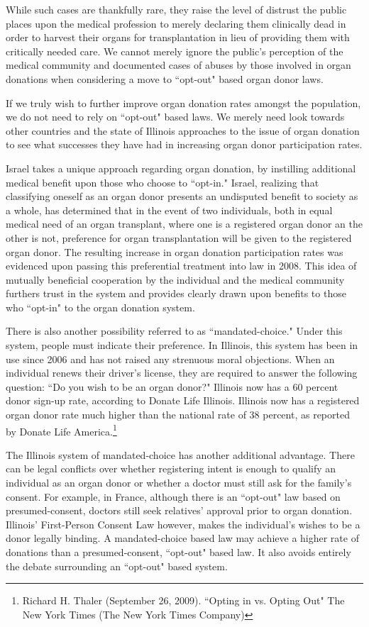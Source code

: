 \documentclass[letterpaper,10pt,twoside]{article}
\begin{document}
While such cases are thankfully rare, they raise the level of distrust the public places upon the medical profession to merely declaring them clinically dead in order to harvest their organs for transplantation  in lieu of providing them with critically needed care.  We cannot merely ignore the public's perception of the medical community and documented cases of abuses by those involved in organ donations when considering a move to ``opt-out" based organ donor laws.

If we truly wish to further improve organ donation rates amongst the population, we do not need to rely on ``opt-out" based laws.  We merely need look towards other countries and the state of Illinois approaches to the issue of organ donation to see what successes they have had in increasing organ donor participation rates.

Israel takes a unique approach regarding organ donation, by instilling additional medical benefit upon those who choose to ``opt-in."  Israel, realizing that classifying oneself as an organ donor presents an undisputed benefit to society as a whole, has determined that in the event of two individuals, both in equal medical need of an organ transplant, where one is a registered organ donor an the other is not, preference for organ transplantation will be given to the registered organ donor.  The resulting increase in organ donation participation rates was evidenced upon passing this preferential treatment into law in 2008.  This idea of mutually beneficial cooperation by the individual and the medical community furthers trust in the system and provides clearly drawn upon benefits to those who ``opt-in" to the organ donation system.

There is also another possibility referred to as ``mandated-choice."  Under this system, people must indicate their preference.  In Illinois, this system has been in use since 2006 and has not raised any strenuous moral objections.  When an individual renews their driver's license, they are required to answer the following question: ``Do you wish to be an organ donor?"  Illinois now has a 60 percent donor sign-up rate, according to Donate Life Illinois.  Illinois now has a registered organ donor rate much higher than the national rate of 38 percent, as reported by Donate Life America.\footnote{Richard H. Thaler (September 26, 2009). ``Opting in vs. Opting Out" The New York Times (The New York Times Company)}

The Illinois system of mandated-choice has another additional advantage.  There can be legal conflicts over whether registering intent is enough to qualify an individual as an organ donor or whether a doctor must still ask for the family's consent. For example, in France, although there is an ``opt-out" law based on presumed-consent, doctors still seek relatives' approval prior to organ donation.  Illinois' First-Person Consent Law however, makes the individual's wishes to be a donor legally binding.  A mandated-choice based  law may achieve a higher rate of donations than a presumed-consent, ``opt-out" based law.  It also avoids entirely the debate surrounding an ``opt-out" based system.
\end{document}
